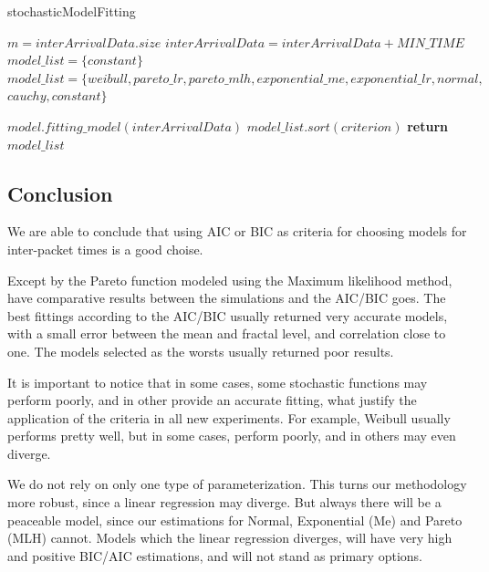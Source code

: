 \begin{algorithm}[ht!]
	\caption{stochasticModelFitting}
	\label{alg:stochasticModelFitting}
	\begin{algorithmic}[1]
		\small		{}
		\State $m = interArrivalData.size$
		\State $interArrivalData = interArrivalData + MIN\_TIME$
		\State $model\_list = \{constant\}$
		\Else
		\State $model\_list = \{weibull, pareto\_lr, pareto\_mlh, exponential\_me, exponential\_lr, normal,$
		\State $cauchy, constant\}$
		\EndIf
		
		\State $model.fitting\_model(interArrivalData)$
		\EndFor
		\State $model\_list.sort(criterion)$
		\State \textbf{return} $model\_list$
		\EndFunction
	\end{algorithmic}
\end{algorithm}


\subsection{Conclusion}



We are able to conclude that using AIC or BIC as criteria for choosing models for inter-packet times is a good choise.

Except by the Pareto function modeled using the Maximum likelihood method, have comparative results between the simulations and the AIC/BIC goes. The best fittings according to the AIC/BIC usually returned very accurate models, with a small error between the mean and fractal level, and correlation close to one. The models selected as the worsts usually returned poor results.

It is important to notice that in some cases, some stochastic functions may perform poorly, and in other provide an accurate fitting, what justify the application of the criteria in all new experiments. For example, Weibull usually performs pretty well, but in some cases, perform poorly, and in others may even diverge. 

We do not rely on only one type of parameterization. This turns our methodology more robust, since a linear regression may diverge. But always there will be a peaceable model, since our estimations for Normal, Exponential (Me) and Pareto (MLH) cannot. Models which the linear regression diverges, will have very high and positive BIC/AIC estimations, and will not stand as primary options.



